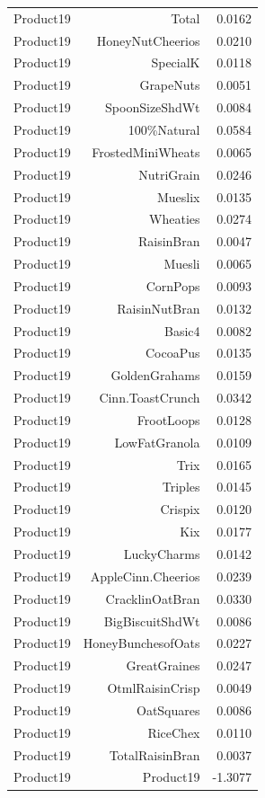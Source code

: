 \begin{longtable}{@{}lrr@{}}
Product19 & Total & 0.0162 \\
Product19 & HoneyNutCheerios & 0.0210 \\
Product19 & SpecialK & 0.0118 \\
Product19 & GrapeNuts & 0.0051 \\
Product19 & SpoonSizeShdWt & 0.0084 \\
Product19 & 100\%Natural & 0.0584 \\
Product19 & FrostedMiniWheats & 0.0065 \\
Product19 & NutriGrain & 0.0246 \\
Product19 & Mueslix & 0.0135 \\
Product19 & Wheaties & 0.0274 \\
Product19 & RaisinBran & 0.0047 \\
Product19 & Muesli & 0.0065 \\
Product19 & CornPops & 0.0093 \\
Product19 & RaisinNutBran & 0.0132 \\
Product19 & Basic4 & 0.0082 \\
Product19 & CocoaPus & 0.0135 \\
Product19 & GoldenGrahams & 0.0159 \\
Product19 & Cinn.ToastCrunch & 0.0342 \\
Product19 & FrootLoops & 0.0128 \\
Product19 & LowFatGranola & 0.0109 \\
Product19 & Trix & 0.0165 \\
Product19 & Triples & 0.0145 \\
Product19 & Crispix & 0.0120 \\
Product19 & Kix & 0.0177 \\
Product19 & LuckyCharms & 0.0142 \\
Product19 & AppleCinn.Cheerios & 0.0239 \\
Product19 & CracklinOatBran & 0.0330 \\
Product19 & BigBiscuitShdWt & 0.0086 \\
Product19 & HoneyBunchesofOats & 0.0227 \\
Product19 & GreatGraines & 0.0247 \\
Product19 & OtmlRaisinCrisp & 0.0049 \\
Product19 & OatSquares & 0.0086 \\
Product19 & RiceChex & 0.0110 \\
Product19 & TotalRaisinBran & 0.0037 \\
Product19 & Product19 & -1.3077 \\

\end{longtable}
